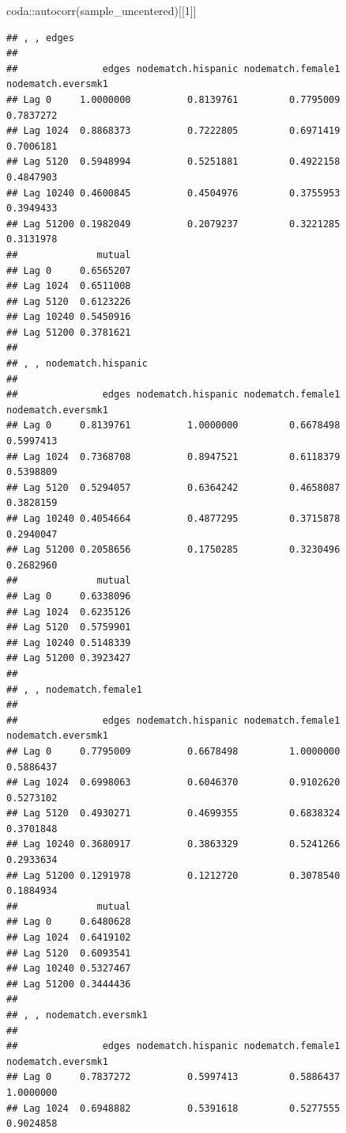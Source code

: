 \documentclass[
]{book}
\newenvironment{Shaded}{\begin{snugshade}}{\end{snugshade}}
\newcommand{\DecValTok}[1]{\textcolor[rgb]{0.00,0.00,0.81}{#1}}
\newcommand{\FunctionTok}[1]{\textcolor[rgb]{0.00,0.00,0.00}{#1}}
\newcommand{\NormalTok}[1]{#1}
\newcommand{\SpecialCharTok}[1]{\textcolor[rgb]{0.00,0.00,0.00}{#1}}
\begin{document}
\begin{enumerate}
\begin{Shaded}
\begin{Highlighting}[]
\NormalTok{coda}\SpecialCharTok{::}\FunctionTok{autocorr}\NormalTok{(sample\_uncentered)[[}\DecValTok{1}\NormalTok{]]}
\end{Highlighting}
\end{Shaded}

\begin{verbatim}
## , , edges
## 
##               edges nodematch.hispanic nodematch.female1 nodematch.eversmk1
## Lag 0     1.0000000          0.8139761         0.7795009          0.7837272
## Lag 1024  0.8868373          0.7222805         0.6971419          0.7006181
## Lag 5120  0.5948994          0.5251881         0.4922158          0.4847903
## Lag 10240 0.4600845          0.4504976         0.3755953          0.3949433
## Lag 51200 0.1982049          0.2079237         0.3221285          0.3131978
##              mutual
## Lag 0     0.6565207
## Lag 1024  0.6511008
## Lag 5120  0.6123226
## Lag 10240 0.5450916
## Lag 51200 0.3781621
## 
## , , nodematch.hispanic
## 
##               edges nodematch.hispanic nodematch.female1 nodematch.eversmk1
## Lag 0     0.8139761          1.0000000         0.6678498          0.5997413
## Lag 1024  0.7368708          0.8947521         0.6118379          0.5398809
## Lag 5120  0.5294057          0.6364242         0.4658087          0.3828159
## Lag 10240 0.4054664          0.4877295         0.3715878          0.2940047
## Lag 51200 0.2058656          0.1750285         0.3230496          0.2682960
##              mutual
## Lag 0     0.6338096
## Lag 1024  0.6235126
## Lag 5120  0.5759901
## Lag 10240 0.5148339
## Lag 51200 0.3923427
## 
## , , nodematch.female1
## 
##               edges nodematch.hispanic nodematch.female1 nodematch.eversmk1
## Lag 0     0.7795009          0.6678498         1.0000000          0.5886437
## Lag 1024  0.6998063          0.6046370         0.9102620          0.5273102
## Lag 5120  0.4930271          0.4699355         0.6838324          0.3701848
## Lag 10240 0.3680917          0.3863329         0.5241266          0.2933634
## Lag 51200 0.1291978          0.1212720         0.3078540          0.1884934
##              mutual
## Lag 0     0.6480628
## Lag 1024  0.6419102
## Lag 5120  0.6093541
## Lag 10240 0.5327467
## Lag 51200 0.3444436
## 
## , , nodematch.eversmk1
## 
##               edges nodematch.hispanic nodematch.female1 nodematch.eversmk1
## Lag 0     0.7837272          0.5997413         0.5886437          1.0000000
## Lag 1024  0.6948882          0.5391618         0.5277555          0.9024858

\end{verbatim}
\end{enumerate}
\end{document}
